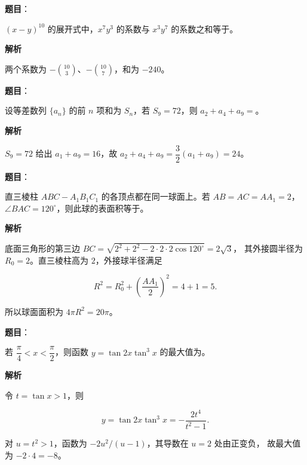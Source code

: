 \begin{answer}

\textbf{题目}：

$(x-y)^{10}$ 的展开式中，$x^7y^3$ 的系数与 $x^3y^7$ 的系数之和等于\gkblank{}。

\textbf{解析}

两个系数为 $-\binom{10}{3}$、$-\binom{10}{7}$，和为 $-240$。


\end{answer}
\begin{answer}

\textbf{题目}：

设等差数列 $\{a_n\}$ 的前 $n$ 项和为 $S_n$，若 $S_9=72$，则 $a_2+a_4+a_9=$\gkblank{}。

\textbf{解析}

$S_9=72$ 给出 $a_1+a_9=16$，故
$a_2+a_4+a_9=\dfrac32(a_1+a_9)=24$。


\end{answer}
\begin{answer}

\textbf{题目}：

直三棱柱 $ABC-A_1B_1C_1$ 的各顶点都在同一球面上。若 $AB=AC=AA_1=2$，$\angle BAC=120^\circ$，则此球的表面积等于\gkblank{}。

\textbf{解析}

底面三角形的第三边
$BC=\sqrt{2^2+2^2-2\cdot2\cdot2\cos120^\circ}=2\sqrt3$，
其外接圆半径为 $R_0=2$。直三棱柱高为 $2$，外接球半径满足

\nopagebreak[4]
\[
R^2=R_0^2+\left(\frac{AA_1}{2}\right)^2=4+1=5.
\]

所以球面面积为 $4\pi R^2=20\pi$。


\end{answer}
\begin{answer}

\textbf{题目}：

若 $\dfrac\pi4<x<\dfrac\pi2$，则函数 $y=\tan2x\tan^3x$ 的最大值为\gkblank{}。

\textbf{解析}

令 $t=\tan x>1$，则

\nopagebreak[4]
\[
y=\tan2x\tan^3x
=-\frac{2t^4}{t^2-1}.
\]

对 $u=t^2>1$，函数为 $-2u^2/(u-1)$，其导数在 $u=2$ 处由正变负，
故最大值为 $-2\cdot4=-8$。


\end{answer}
